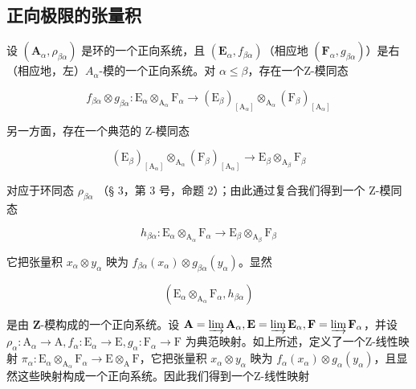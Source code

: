 \subsection{正向极限的张量积}

设 \((\mathbf{A}_{\alpha}, \rho_{\beta\alpha})\) 是环的一个正向系统，且 \((\mathbf{E}_{\alpha}, f_{\beta\alpha})\)（相应地 \((\mathbf{F}_{\alpha}, g_{\beta\alpha})\)）是右（相应地，左）\(A_{\alpha}\)-模的一个正向系统。对 \(\alpha \leqslant \beta\)，存在一个Z-模同态

\[
f _ {\beta \alpha} \otimes g _ {\beta \alpha}: \mathrm{E} _ {\alpha} \otimes_ {\mathrm{A} _ {\alpha}} \mathrm{F} _ {\alpha} \rightarrow (\mathrm{E} _ {\beta}) _ {[ \mathrm{A} _ {\alpha} ]} \otimes_ {\mathrm{A} _ {\alpha}} (\mathrm{F} _ {\beta}) _ {[ \mathrm{A} _ {\alpha} ]}
\]

另一方面，存在一个典范的 Z-模同态

\[
\left(\mathrm{E} _ {\beta}\right) _ {[ \mathrm{A} _ {\alpha} ]} \otimes_ {\mathrm{A} _ {\alpha}} \left(\mathrm{F} _ {\beta}\right) _ {[ \mathrm{A} _ {\alpha} ]} \rightarrow \mathrm{E} _ {\beta} \otimes_ {\mathrm{A} _ {\beta}} \mathrm{F} _ {\beta}
\]

对应于环同态 \(\rho_{\beta \alpha}\) （§ 3，第 3 号，命题 2）；由此通过复合我们得到一个 Z-模同态

\[
h _ {\beta \alpha}: \mathrm{E} _ {\alpha} \otimes_ {\mathrm{A} _ {\alpha}} \mathrm{F} _ {\alpha} \rightarrow \mathrm{E} _ {\beta} \otimes_ {\mathrm{A} _ {\beta}} \mathrm{F} _ {\beta}
\]

它把张量积 \(x_{\alpha} \otimes y_{\alpha}\) 映为 \(f_{\beta\alpha}(x_{\alpha}) \otimes g_{\beta\alpha}(y_{\alpha})\)。显然

\[
\left(\mathrm{E} _ {\alpha} \otimes_ {\mathrm{A} _ {\alpha}} \mathrm{F} _ {\alpha}, h _ {\beta \alpha}\right)
\]

是由 \(\mathbf{Z}\)-模构成的一个正向系统。设 \(\mathbf{A} = \varinjlim \mathbf{A}_{\alpha}, \mathbf{E} = \varinjlim \mathbf{E}_{\alpha}, \mathbf{F} = \varinjlim \mathbf{F}_{\alpha}\)，并设 \(\rho_{\alpha}: \mathrm{A}_{\alpha} \to \mathrm{A}, f_{\alpha}: \mathrm{E}_{\alpha} \to \mathrm{E}, g_{\alpha}: \mathrm{F}_{\alpha} \to \mathrm{F}\) 为典范映射。如上所述，定义了一个Z-线性映射 \(\pi_{\alpha}: \mathrm{E}_{\alpha} \otimes_{\mathrm{A}_{\alpha}} \mathrm{F}_{\alpha} \to \mathrm{E} \otimes_{\mathrm{A}} \mathrm{F}\)，它把张量积 \(x_{\alpha} \otimes y_{\alpha}\) 映为 \(f_{\alpha}(x_{\alpha}) \otimes g_{\alpha}(y_{\alpha})\)，且显然这些映射构成一个正向系统。因此我们得到一个Z-线性映射

